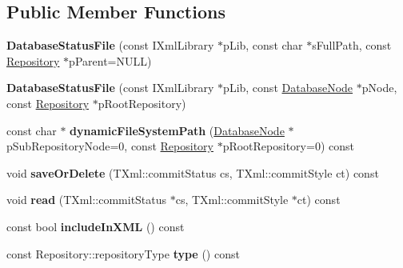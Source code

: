 \subsection*{\-Public \-Member \-Functions}
\begin{DoxyCompactItemize}
\item 
\hypertarget{classgeneral__server_1_1DatabaseStatusFile_af74798edb297795ba664488e5961e79d}{{\bfseries \-Database\-Status\-File} (const \-I\-Xml\-Library $\ast$p\-Lib, const char $\ast$s\-Full\-Path, const \hyperlink{classgeneral__server_1_1Repository}{\-Repository} $\ast$p\-Parent=\-N\-U\-L\-L)}\label{classgeneral__server_1_1DatabaseStatusFile_af74798edb297795ba664488e5961e79d}

\item 
\hypertarget{classgeneral__server_1_1DatabaseStatusFile_a60e17d62b9cf94ad9096a7af30a8d850}{{\bfseries \-Database\-Status\-File} (const \-I\-Xml\-Library $\ast$p\-Lib, const \hyperlink{classgeneral__server_1_1DatabaseNode}{\-Database\-Node} $\ast$p\-Node, const \hyperlink{classgeneral__server_1_1Repository}{\-Repository} $\ast$p\-Root\-Repository)}\label{classgeneral__server_1_1DatabaseStatusFile_a60e17d62b9cf94ad9096a7af30a8d850}

\item 
\hypertarget{classgeneral__server_1_1DatabaseStatusFile_a3ad133aa49b33b097efe20e221a31db8}{const char $\ast$ {\bfseries dynamic\-File\-System\-Path} (\hyperlink{classgeneral__server_1_1DatabaseNode}{\-Database\-Node} $\ast$p\-Sub\-Repository\-Node=0, const \hyperlink{classgeneral__server_1_1Repository}{\-Repository} $\ast$p\-Root\-Repository=0) const }\label{classgeneral__server_1_1DatabaseStatusFile_a3ad133aa49b33b097efe20e221a31db8}

\item 
\hypertarget{classgeneral__server_1_1DatabaseStatusFile_aff102a9b9e73577163fedbd119dd99f6}{void {\bfseries save\-Or\-Delete} (\-T\-Xml\-::commit\-Status cs, \-T\-Xml\-::commit\-Style ct) const }\label{classgeneral__server_1_1DatabaseStatusFile_aff102a9b9e73577163fedbd119dd99f6}

\item 
\hypertarget{classgeneral__server_1_1DatabaseStatusFile_a01715fa4449129a9bb7b33cf8221c5a8}{void {\bfseries read} (\-T\-Xml\-::commit\-Status $\ast$cs, \-T\-Xml\-::commit\-Style $\ast$ct) const }\label{classgeneral__server_1_1DatabaseStatusFile_a01715fa4449129a9bb7b33cf8221c5a8}

\item 
\hypertarget{classgeneral__server_1_1DatabaseStatusFile_a57ea073cb46cba981e362113876a7620}{const bool {\bfseries include\-In\-X\-M\-L} () const }\label{classgeneral__server_1_1DatabaseStatusFile_a57ea073cb46cba981e362113876a7620}

\item 
\hypertarget{classgeneral__server_1_1DatabaseStatusFile_a925881756a660d5739f1cf493a33cf33}{const \-Repository\-::repository\-Type {\bfseries type} () const }\label{classgeneral__server_1_1DatabaseStatusFile_a925881756a660d5739f1cf493a33cf33}

\end{DoxyCompactItemize}
